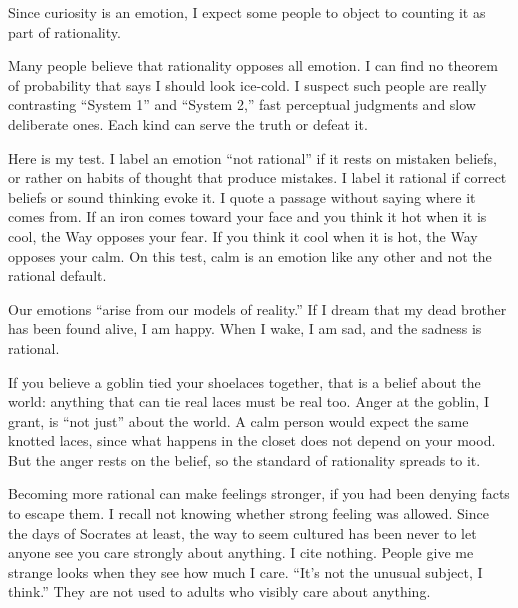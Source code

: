 
Since curiosity is an emotion, I expect some people to object to counting it as part of rationality. 

Many people believe that rationality opposes all emotion. I can find no theorem of probability that says I should look ice-cold. I suspect such people are really contrasting ``System 1'' and ``System 2,'' fast perceptual judgments and slow deliberate ones. Each kind can serve the truth or defeat it.

Here is my test. I label an emotion ``not rational'' if it rests on mistaken beliefs, or rather on habits of thought that produce mistakes. I label it rational if correct beliefs or sound thinking evoke it. I quote a passage without saying where it comes from. If an iron comes toward your face and you think it hot when it is cool, the Way opposes your fear. If you think it cool when it is hot, the Way opposes your calm.  On this test, calm is an emotion like any other and not the rational default.

Our emotions ``arise from our models of reality.'' If I dream that my dead brother has been found alive, I am happy. When I wake, I am sad, and the sadness is rational. 

If you believe a goblin tied your shoelaces together, that is a belief about the world: anything that can tie real laces must be real too. Anger at the goblin, I grant, is ``not just'' about the world. A calm person would expect the same knotted laces, since what happens in the closet does not depend on your mood. But the anger rests on the belief, so the standard of rationality spreads to it. 

Becoming more rational can make feelings stronger, if you had been denying facts to escape them. I recall not knowing whether strong feeling was allowed. Since the days of Socrates at least, the way to seem cultured has been never to let anyone see you care strongly about anything. I cite nothing.  People give me strange looks when they see how much I care. ``It's not the unusual subject, I think.'' They are not used to adults who visibly care about anything.

